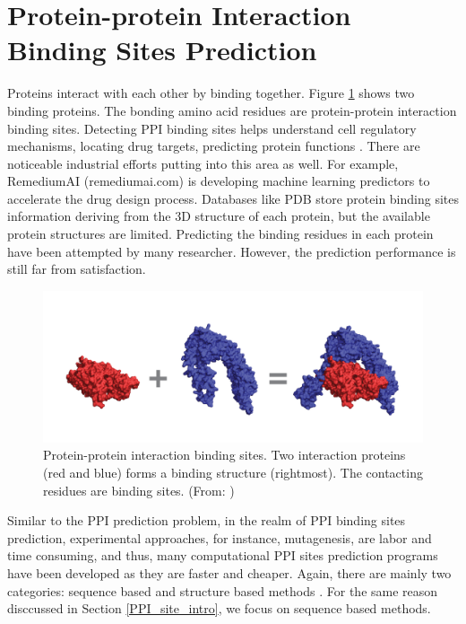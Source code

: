 \section{Protein-protein Interaction Binding Sites Prediction}
Proteins interact with each other by binding together. Figure \ref{fig_ppi_bind} shows two binding proteins. The bonding amino acid residues are protein-protein interaction binding sites. Detecting PPI binding sites helps understand cell regulatory mechanisms, locating drug targets, predicting protein functions \cite{bonetta2010interactome}. There are noticeable industrial efforts putting into this area as well. For example, RemediumAI (remediumai.com) is developing machine learning predictors to accelerate the drug design process. Databases like PDB \cite{berman2002protein} store protein binding sites information deriving from the 3D structure of each protein, but the available protein structures are limited. Predicting the binding residues in each protein have been attempted by many researcher. However, the prediction performance is still far from satisfaction. 
\begin{figure}[h!]
\begin{center}
\includegraphics[width=12cm]{img/binding_sites.png}
\end{center}
\caption[Illustration of protein-protein interaction binding sites]{Protein-protein interaction binding sites. Two interaction proteins (red and blue) forms a binding structure (rightmost). The contacting residues are binding sites. (From: \cite{townshend2018generalizable}) \label{fig_ppi_bind}}
\end{figure}

Similar to the PPI prediction problem, in the realm of PPI binding sites prediction, experimental approaches, for instance, mutagenesis, are labor and time consuming, and thus, many computational PPI sites prediction programs have been developed as they are faster and cheaper. Again, there are mainly two categories: sequence based and structure based methods \cite{esmaielbeiki2016progress}. For the same reason disccussed in Section \ref{PPI_site_intro}, we focus on sequence based methods.

